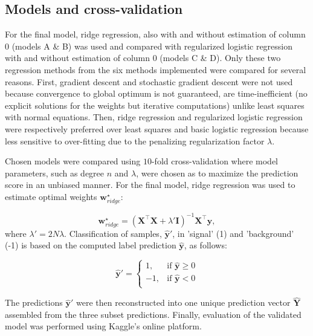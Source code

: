\documentclass[10pt,conference,compsocconf]{IEEEtran}
\begin{document}
\subsection{Models and cross-validation}

For the final model, ridge regression, also with and without estimation of column 0 (models A \& B) was used and compared with regularized logistic regression with and without estimation of column 0 (models C \& D). Only these two regression methods from the six methods implemented were compared for several reasons.
First, gradient descent and stochastic gradient descent were not used because convergence to global optimum is not guaranteed, are time-inefficient (no explicit solutions for the weights but iterative computations) unlike least squares with normal equations.
Then, ridge regression and regularized logistic regression were respectively preferred over least squares and basic logistic regression because less sensitive to over-fitting due to the penalizing regularization factor $\lambda$.

Chosen models were compared using $10$-fold cross-validation where model parameters, such as degree $n$ and $\lambda$, were chosen as to maximize the prediction score in an unbiased manner. For the final model, ridge regression was used to estimate optimal weights $\mathbf{w}^{\star}_{ridge}$:

\begin{equation}
    \mathbf{w}^{\star}_{ridge} = (\mathbf{X}^{\top}\mathbf{X} + \lambda'\mathbf{I})^{-1}\mathbf{X}^{\top}\mathbf{y},
\end{equation}
where  $\lambda' = 2N\lambda$. Classification of samples, $\mathbf{\hat{y}}'$, in 'signal' (1) and 'background' (-1) is based on the computed label prediction $\mathbf{\hat{y}}$, as follows:

\begin{equation} \label{eq:3}
\mathbf{\hat{y}}' =  
\begin{cases}
1, &\mbox{if } \mathbf{\hat{y}} \ge 0 \\
-1,  & \mbox{if } \mathbf{\hat{y}} < 0 \\
\end{cases}
\end{equation}

The predictions $\mathbf{\hat{y}}'$ were then reconstructed into one unique prediction vector $\mathbf{\hat{Y}}$ assembled from the three subset predictions. Finally, evaluation of the validated model was performed using Kaggle's online platform.
\end{document}
